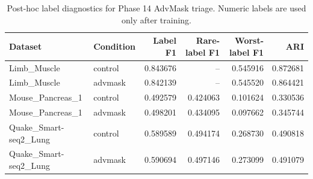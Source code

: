 \begin{table}[ht]
\centering
\caption{Post-hoc label diagnostics for Phase 14 AdvMask triage. Numeric labels are used only after training.}
\label{tab:generated-phase14-posthoc-labels}
\begin{tabular}{llrrrr}
\toprule
Dataset & Condition & Label F1 & Rare-label F1 & Worst-label F1 & ARI \\
\midrule
Limb\_Muscle & control & 0.843676 & -- & 0.545916 & 0.872681 \\
Limb\_Muscle & advmask & 0.842139 & -- & 0.545520 & 0.864421 \\
Mouse\_Pancreas\_1 & control & 0.492579 & 0.424063 & 0.101624 & 0.330536 \\
Mouse\_Pancreas\_1 & advmask & 0.498201 & 0.434095 & 0.097662 & 0.345744 \\
Quake\_Smart-seq2\_Lung & control & 0.589589 & 0.494174 & 0.268730 & 0.490818 \\
Quake\_Smart-seq2\_Lung & advmask & 0.590694 & 0.497146 & 0.273099 & 0.491079 \\
\bottomrule
\end{tabular}
\end{table}
